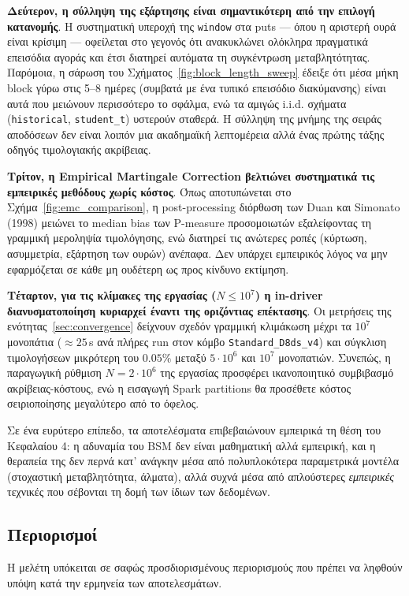 \documentclass[12pt]{article}
\begin{document}
\textbf{Δεύτερον, η σύλληψη της εξάρτησης είναι σημαντικότερη από την επιλογή κατανομής}. Η συστηματική υπεροχή της \texttt{window} στα puts — όπου η αριστερή ουρά είναι κρίσιμη — οφείλεται στο γεγονός ότι ανακυκλώνει ολόκληρα πραγματικά επεισόδια αγοράς και έτσι διατηρεί αυτόματα τη συγκέντρωση μεταβλητότητας. Παρόμοια, η σάρωση του Σχήματος~\ref{fig:block_length_sweep} έδειξε ότι μέσα μήκη block γύρω στις 5--8 ημέρες (συμβατά με ένα τυπικό επεισόδιο διακύμανσης) είναι αυτά που μειώνουν περισσότερο το σφάλμα, ενώ τα αμιγώς i.i.d. σχήματα (\texttt{historical}, \texttt{student\_t}) υστερούν σταθερά. Η σύλληψη της μνήμης της σειράς αποδόσεων δεν είναι λοιπόν μια ακαδημαϊκή λεπτομέρεια αλλά ένας πρώτης τάξης οδηγός τιμολογιακής ακρίβειας.

\textbf{Τρίτον, η Empirical Martingale Correction βελτιώνει συστηματικά τις εμπειρικές μεθόδους χωρίς κόστος}. Όπως αποτυπώνεται στο Σχήμα~\ref{fig:emc_comparison}, η post-processing διόρθωση των Duan και Simonato (1998) μειώνει το median bias των P-measure προσομοιωτών εξαλείφοντας τη γραμμική μεροληψία τιμολόγησης, ενώ διατηρεί τις ανώτερες ροπές (κύρτωση, ασυμμετρία, εξάρτηση των ουρών) ανέπαφα. Δεν υπάρχει εμπειρικός λόγος να μην εφαρμόζεται σε κάθε μη ουδέτερη ως προς κίνδυνο εκτίμηση.

\textbf{Τέταρτον, για τις κλίμακες της εργασίας ($N \leq 10^{7}$) η in-driver διανυσματοποίηση κυριαρχεί έναντι της οριζόντιας επέκτασης}. Οι μετρήσεις της ενότητας~\ref{sec:convergence} δείχνουν σχεδόν γραμμική κλιμάκωση μέχρι τα $10^{7}$ μονοπάτια ($\approx 25\,$s ανά πλήρες run στον κόμβο \texttt{Standard\_D8ds\_v4}) και σύγκλιση τιμολογήσεων μικρότερη του $0.05\%$ μεταξύ $5\cdot 10^{6}$ και $10^{7}$ μονοπατιών. Συνεπώς, η παραγωγική ρύθμιση $N = 2\cdot 10^{6}$ της εργασίας προσφέρει ικανοποιητικό συμβιβασμό ακρίβειας-κόστους, ενώ η εισαγωγή Spark partitions θα προσέθετε κόστος σειριοποίησης μεγαλύτερο από το όφελος.

Σε ένα ευρύτερο επίπεδο, τα αποτελέσματα επιβεβαιώνουν εμπειρικά τη θέση του Κεφαλαίου 4: η αδυναμία του BSM δεν είναι μαθηματική αλλά εμπειρική, και η θεραπεία της δεν περνά κατ' ανάγκην μέσα από πολυπλοκότερα παραμετρικά μοντέλα (στοχαστική μεταβλητότητα, άλματα), αλλά συχνά μέσα από απλούστερες \emph{εμπειρικές} τεχνικές που σέβονται τη δομή των ίδιων των δεδομένων.

\subsection{Περιορισμοί}
Η μελέτη υπόκειται σε σαφώς προσδιορισμένους περιορισμούς που πρέπει να ληφθούν υπόψη κατά την ερμηνεία των αποτελεσμάτων.
\end{document}

